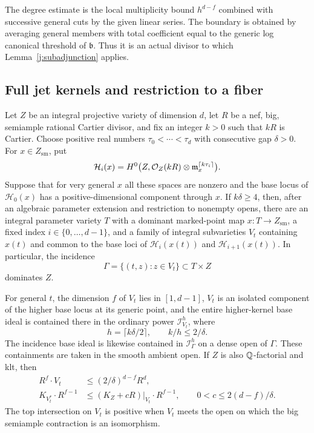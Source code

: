 The degree estimate is the local multiplicity bound $h^{d-f}$
combined with successive general cuts by the given linear series.
The boundary is obtained by averaging general members with total
coefficient equal to the generic log canonical threshold of
$\mathfrak b$.  Thus it is an actual divisor to which
Lemma~\ref{j:subadjunction} applies.

\subsection{Full jet kernels and restriction to a fiber}

\begin{lemma}
\label{j:moving-kernel}
Let $Z$ be an integral projective variety of dimension $d$, let
$R$ be a nef, big, semiample rational Cartier divisor, and fix
an integer $k>0$ such that $kR$ is Cartier.  Choose positive real
numbers $\tau_0<\cdots<\tau_d$ with consecutive gap $\delta>0$.
For $x\in Z_{\mathrm{sm}}$, put
\[
 \mathcal H_i(x)=H^0\bigl(Z,\mathcal O_Z(kR)
                  \otimes\mathfrak m_x^{\lceil k\tau_i\rceil}\bigr).
\]
Suppose that for very general $x$ all these spaces are nonzero and
the base locus of $\mathcal H_0(x)$ has a positive-dimensional
component through $x$.  If $k\delta\geq4$, then, after an
algebraic parameter extension and restriction to nonempty opens,
there are an integral parameter variety $T$ with a dominant
marked-point map $x:T\to Z_{\mathrm{sm}}$, a fixed index
$i\in\{0,\ldots,d-1\}$, and a family of integral subvarieties
$V_t$ containing $x(t)$ and common to the base loci of
$\mathcal H_i(x(t))$ and $\mathcal H_{i+1}(x(t))$.  In particular,
the incidence
\[
 \Gamma=\{(t,z):z\in V_t\}\subset T\times Z
\]
dominates $Z$.

For general $t$, the dimension $f$ of $V_t$ lies in $[1,d-1]$,
$V_t$ is an isolated component of the higher base locus at its
generic point, and the entire higher-kernel base ideal is
contained there in the ordinary power $\mathcal I_{V_t}^h$, where
\[
 h=\lceil k\delta/2\rceil,\qquad k/h\leq2/\delta.
\]
The incidence base ideal is likewise contained in
$\mathcal I_\Gamma^h$ on a dense open of $\Gamma$.
These containments are taken in the smooth ambient open.
If $Z$ is also $\mathbb Q$-factorial and klt, then
\begin{equation}
\label{j:moving-bounds}
 \begin{split}
 R^f\cdot V_t&\leq(2/\delta)^{d-f}R^d,\\
 K_{V_t^*}\cdot R^{f-1}
   &\leq(K_Z+cR)|_{V_t}\cdot R^{f-1},
       \qquad 0<c\leq2(d-f)/\delta.
 \end{split}
\end{equation}
The top intersection on $V_t$ is positive when $V_t$ meets the
open on which the big semiample contraction is an isomorphism.
\end{lemma}


